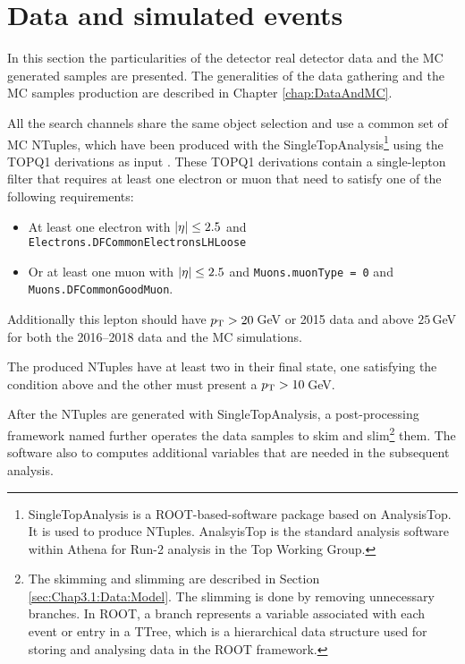 




\section{Data and simulated events }
\label{sec:ChaptH:Data_and_MC}
In this section the particularities of the detector real detector data
and the MC generated samples are presented. The generalities 
of the data gathering and the MC samples production are
described in Chapter \ref{chap:DataAndMC}.

All the search channels share the same object selection and use a common set of MC NTuples\cite{SgTopRun2NtuplesContents}, which 
have been produced with the SingleTopAnalysis\footnote{SingleTopAnalysis is
a ROOT-based-software package based on AnalysisTop. It is used to produce
NTuples. AnalsyisTop is the standard analysis software within Athena for Run-2 analysis 
in the Top Working Group.} using the TOPQ1 derivations%
as input \cite{TOPQ}. These TOPQ1 derivations contain a single-lepton filter 
that requires at least one electron or muon that need to satisfy one of the following requirements:
\begin{itemize}
	\item At least one electron with $|\eta| \leq 2.5$ and \texttt{Electrons.DFCommonElectronsLHLoose}
	\item Or at least one muon with $|\eta| \leq 2.5$ and \texttt{Muons.muonType = 0} and \texttt{Muons.DFCommonGoodMuon}.
\end{itemize}
Additionally this lepton should have $p_{\text{T}} >20\,$GeV or 2015 data and above $25\,$GeV 
for both the 2016--2018 data and the MC simulations.

The produced NTuples have at least two \emu in their final state, one satisfying the condition above and
the other must present a  $p_{\text{T}} >10\,$GeV. 

After the NTuples are generated with SingleTopAnalysis, a post-processing framework named \thqloop 
further operates the data samples to skim and slim\footnote{The skimming and slimming are described
in Section \ref{sec:Chap3.1:Data:Model}. The slimming is done by removing unnecessary branches. In ROOT, a branch represents a variable associated with each event or entry in a TTree, which is a hierarchical data structure used for storing and analysing data in the ROOT framework.} them. 
The \thqloop software also to computes additional variables that are needed in the subsequent analysis.





